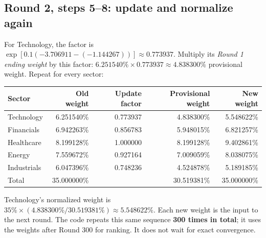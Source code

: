 \documentclass[11pt,letterpaper]{article}
\newcommand{\topic}[1]{\Needspace{5\baselineskip}\subsection*{#1}}
\begin{document}
\topic{Round 2, steps 5--8: update and normalize again}
For Technology, the factor is $\exp[0.1(-3.706911-(-1.144267))]\approx0.773937$. Multiply its \emph{Round 1 ending weight} by this factor: $6.251540\%\times0.773937\approx4.838300\%$ provisional weight. Repeat for every sector:
\begin{center}
\small
\begin{tabular}{@{}lrrrr@{}}
\toprule
Sector & Old weight & Update factor & Provisional weight & New weight\\
\midrule
Technology & 6.251540\% & 0.773937 & 4.838300\% & 5.548622\%\\
Financials & 6.942263\% & 0.856783 & 5.948015\% & 6.821257\%\\
Healthcare & 8.199128\% & 1.000000 & 8.199128\% & 9.402861\%\\
Energy & 7.559672\% & 0.927164 & 7.009059\% & 8.038075\%\\
Industrials & 6.047396\% & 0.748236 & 4.524878\% & 5.189185\%\\
\midrule
Total & 35.000000\% & & 30.519381\% & 35.000000\%\\
\bottomrule
\end{tabular}
\end{center}
Technology's normalized weight is $35\%\times(4.838300\%/30.519381\%)\approx5.548622\%$. Each new weight is the input to the next round. The code repeats this same sequence \textbf{300 times in total}; it uses the weights after Round 300 for ranking. It does not wait for exact convergence.
\end{document}
